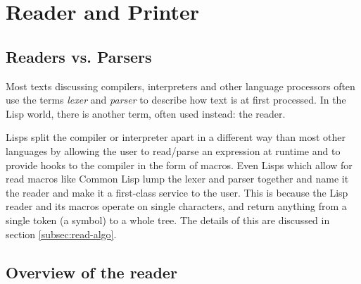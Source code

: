 \documentclass[a4paper,10pt,twoside]{report}
\newcommand{\el}{Emacs Lisp}
\newcommand{\cl}{Common Lisp}
\begin{document}


\chapter{Reader and Printer}
\label{sec:reader-printer}

\section{Readers vs. Parsers}
\label{subsec:readers-vs-parsers}

Most texts discussing compilers, interpreters and other language processors
often use the terms \emph{lexer} and \emph{parser} to describe how text is at
first processed.  In the Lisp world, there is another term, often used instead:
the reader.

Lisps split the compiler or interpreter apart in a different way than most other
languages by allowing the user to read/parse an expression at runtime and to
provide hooks to the compiler in the form of macros.  Even Lisps which allow for
read macros like \cl{} lump the lexer and parser together and name it the reader
and make it a first-class service to the user.  This is because the Lisp reader
and its macros operate on single characters, and return anything from a single
token (a symbol) to a whole tree.  The details of this are discussed in section
\ref{subsec:read-algo}.

\section{Overview of the reader}
\label{subsec:reader}
\end{document}
